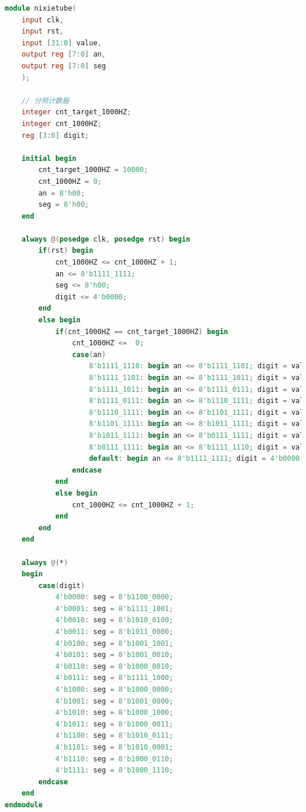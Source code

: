 \documentclass[UTF8]{article}
\begin{document}
\begin{enumerate}
\begin{lstlisting}[language=verilog]
module nixietube(
    input clk,
    input rst,
    input [31:0] value,
    output reg [7:0] an,
    output reg [7:0] seg
    );
    
    // 分频计数器
    integer cnt_target_1000HZ;
    integer cnt_1000HZ;
    reg [3:0] digit;
    
    initial begin
        cnt_target_1000HZ = 10000;
        cnt_1000HZ = 0;
        an = 8'h00;
        seg = 8'h00;
    end
    
    always @(posedge clk, posedge rst) begin
        if(rst) begin
            cnt_1000HZ <= cnt_1000HZ + 1;
            an <= 8'b1111_1111;
            seg <= 8'h00;
            digit <= 4'b0000;
        end
        else begin
            if(cnt_1000HZ == cnt_target_1000HZ) begin
                cnt_1000HZ <=  0;
                case(an)
                    8'b1111_1110: begin an <= 8'b1111_1101; digit = value[3:0]; end
                    8'b1111_1101: begin an <= 8'b1111_1011; digit = value[7:3]; end
                    8'b1111_1011: begin an <= 8'b1111_0111; digit = value[11:7]; end
                    8'b1111_0111: begin an <= 8'b1110_1111; digit = value[15:11]; end
                    8'b1110_1111: begin an <= 8'b1101_1111; digit = value[19:15]; end
                    8'b1101_1111: begin an <= 8'b1011_1111; digit = value[23:19]; end
                    8'b1011_1111: begin an <= 8'b0111_1111; digit = value[27:23]; end
                    8'b0111_1111: begin an <= 8'b1111_1110; digit = value[31:27]; end
                    default: begin an <= 8'b1111_1111; digit = 4'b0000; end
                endcase
            end
            else begin
                cnt_1000HZ <= cnt_1000HZ + 1;
            end
        end
    end
    
    always @(*)
    begin
        case(digit)
            4'b0000: seg = 8'b1100_0000;
            4'b0001: seg = 8'b1111_1001;
            4'b0010: seg = 8'b1010_0100;
            4'b0011: seg = 8'b1011_0000;
            4'b0100: seg = 8'b1001_1001;
            4'b0101: seg = 8'b1001_0010;
            4'b0110: seg = 8'b1000_0010;
            4'b0111: seg = 8'b1111_1000;
            4'b1000: seg = 8'b1000_0000;
            4'b1001: seg = 8'b1001_0000;
            4'b1010: seg = 8'b1000_1000;
            4'b1011: seg = 8'b1000_0011;
            4'b1100: seg = 8'b1010_0111;
            4'b1101: seg = 8'b1010_0001;
            4'b1110: seg = 8'b1000_0110;
            4'b1111: seg = 8'b1000_1110;
        endcase
    end
endmodule
	\end{lstlisting}
\end{enumerate}
\end{document}
